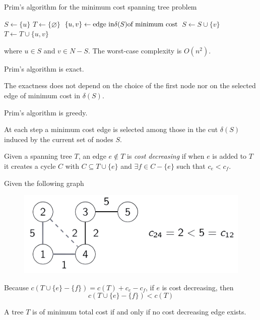 \documentclass[12pt, a4paper]{report}
\newtheorem[style=M,bodystyle=\normalfont]{proposition}{Proposition}
\newtheorem[style=M,bodystyle=\normalfont]{theorem}{Theorem}
\newtheorem[style=M,bodystyle=\normalfont]{corollary}{Corollary}
\newtheorem[style=M,bodystyle=\normalfont]{lemma}{Lemma}
\newtheorem[style=M,bodystyle=\normalfont]{definition}{Definition}
\begin{document}
    \begin{algorithm}[H]
        \caption{Prim's algorithm for the minimum cost spanning tree problem}
            \begin{algorithmic}[1]
                \State $S \leftarrow \{u\}$
                \State $T \leftarrow \{\varnothing\}$
                    \State $\{u,v\}\leftarrow \textnormal{edge in} \delta(S) \textnormal{of minimum cost}$
                    \State $S \leftarrow S \cup \{v\}$
                    \State $T \leftarrow T \cup \{u,v\}$
                \EndWhile
            \end{algorithmic}
    \end{algorithm}
    where $u \in S$ and $v \in N-S$. The worst-case complexity is $O(n^2)$. 
    \begin{example}[Proposition]
        Prim's algorithm is exact. 
    \end{example}        
    The exactness does not depend on the choice of the first node nor on the selected edge of minimum cost in $\delta(S)$. 
    \begin{example}[Proposition]
        Prim's algorithm is greedy. 
    \end{example}     
    At each step a minimum cost edge is selected among those in the cut $\delta (S)$ induced by the current set of nodes $S$. 
    \begin{definition}
        Given a spanning tree $T$, an edge $e \notin T$ is \emph{cost decreasing} if when $e$ is added to $T$ it creates a cycle $C$ with $C \subseteq T \cup \{e\}$ and 
        $\exists f \in C-\{e\}$ such that $c_e<c_f$. 
    \end{definition}
    \begin{example}
        Given the following graph
        \begin{figure}[H]
            \centering
            \includegraphics[width=0.5\linewidth]{images/costdecreasing.png}
        \end{figure}
        Because $c(T \cup \{e\}-\{f\})=c(T)+c_e-c_f$, if $e$ is cost decreasing, then
        \[c(T \cup \{e\}-\{f\})<c(T)\]
    \end{example}
    \begin{theorem}
        A tree $T$ is of minimum total cost if and only if no cost decreasing edge exists. 
    \end{theorem}
\end{document}
